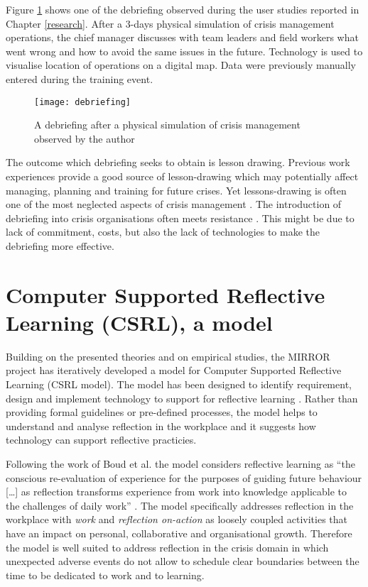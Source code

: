 Figure \ref{fig:debriefing-example} shows one of the debriefing observed during the user studies reported in Chapter \ref{research}. After a 3-days physical simulation of crisis management operations, the chief manager discusses with team leaders and field workers what went wrong and how to avoid the same issues in the future. Technology is used to visualise location of operations on a digital map. Data were previously manually entered during the training event.

\begin{figure}
	[tbh] \centering 
	\texttt{[image: debriefing]} \caption{A debriefing after a physical simulation of crisis management observed by the author} \label{fig:debriefing-example} 
\end{figure}

The outcome which debriefing seeks to obtain is lesson drawing. Previous work experiences provide a good source of lesson-drawing which may potentially affect managing, planning and training for future crises. Yet lessons-drawing is often one of the most neglected aspects of crisis management \autocites{Lagadec:1997js}{Stern:1997eb}. The introduction of debriefing into crisis organisations often meets resistance \autocite{Lagadec:1997js}. This might be due to lack of commitment, costs, but also the lack of technologies to make the debriefing more effective.

\section{Computer Supported Reflective Learning (CSRL), a model}\label{computer-supported-reflective-learning-a-model}

Building on the presented theories and on empirical studies, the MIRROR project has iteratively developed a model for Computer Supported Reflective Learning (CSRL model). The model has been designed to identify requirement, design and implement technology to support for reflective learning \autocite{Krogstie:2013kf}. Rather than providing formal guidelines or pre-defined processes, the model helps to understand and analyse reflection in the workplace and it suggests how technology can support reflective practicies.

Following the work of Boud et al. \autocite*{boud1985reflection} the model considers reflective learning as ``the conscious re-evaluation of experience for the purposes of guiding future behaviour {[}\ldots{}{]} as reflection transforms experience from work into knowledge applicable to the challenges of daily work'' \autocite{Krogstie:2013kf}. The model specifically addresses reflection in the workplace with \emph{work} and \emph{reflection on-action} as loosely coupled activities that have an impact on personal, collaborative and organisational growth. Therefore the model is well suited to address reflection in the crisis domain in which unexpected adverse events do not allow to schedule clear boundaries between the time to be dedicated to work and to learning.

